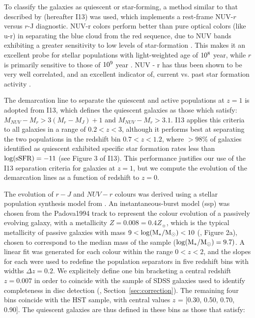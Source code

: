 \documentclass[useAMS,usenatbib]{mn2e}
\begin{document}
To classify the galaxies as quiescent or star-forming, a method similar to that described by \citet{Ilbert2013} (hereafter I13) was used, which implements a rest-frame NUV-$r$ versus $r$-J diagnostic. NUV-r colors perform better than pure optical colors (like u-r) in separating the blue cloud from the red sequence, due to NUV bands exhibiting a greater sensitivity to low levels of star-formation \citep{Martin2007,Wyder2007}. This makes it an excellent probe for stellar populations with light-weighted age of $\rm 10^8$ year, while $r$ is primarily sensitive to those of $\rm 10^9$ year \citep{Arnouts2007a}. NUV - r has thus been shown to be very well correlated, and an excellent indicator of, current vs. past star formation activity \citep{Martin2005,Salim2005a}.  

The demarcation line to separate the quiescent and active populations at $z=1$ is adopted from I13, which defines the quiescent galaxies as those which satisfy: $M_{NUV}-M_{r} > 3(M_{r}-M_{J})+1$ and $M_{NUV}-M_{r} > 3.1$. I13 applies this criteria to all galaxies in a range of $0.2<z<3$, although it performs best at separating the two populations in the redshift bin $0.7<z<1.2$, where $>98\%$ of galaxies identified as quiescent exhibited specific star formation rates less than $\rm \log(sSFR) = -11$ (see Figure 3 of I13). This performance justifies our use of the I13 separation criteria for galaxies at $z=1$, but we compute the evolution of the demarcation lines as a function of redshift to $z=0$. 

The evolution of $r-J$ and $NUV-r$ colours was derived using a stellar population synthesis model from \citet{Bruzual2003}. An instantaneous-burst model (ssp) was chosen from the Padova1994 track to represent the colour evolution of a passively evolving galaxy, with a metallicity $Z=0.008=0.4Z_{\sun}$, which is the typical metallicity of passive galaxies with mass $9 < \rm \log(M_{*}/M_{\odot}) < 10$ (\citet{Peng2015}, Figure 2a), chosen to correspond to the median mass of the sample ($\rm \log(M_{*}/M_{\odot})=9.7)$. A linear fit was generated for each colour within the range $0<z<2$, and the slopes for each were used to redefine the population separators in five redshift bins with widths $\Delta z=0.2$. We explicitely define one bin bracketing a central redshift $z=0.007$ in order to coincide with the sample of SDSS galaxies used to identify completeness in disc detection (, Section~\ref{sec:correction}). The remaining four bins coincide with the HST sample, with central values $z$ = [0.30, 0.50, 0.70, 0.90]. The quiescent galaxies are thus defined in these bins as those that satisfy:
\end{document}
